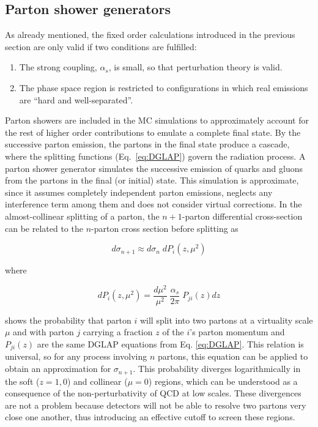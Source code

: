 \subsection{Parton shower generators}
    \label{subsec:PartonShowerGenerators}

As already mentioned, the fixed order calculations introduced in the previous section are only valid if two conditions are fulfilled:

\begin{enumerate}
\item The strong coupling, $\alpha_s$, is small, so that perturbation theory is valid.
\item The phase space region is restricted to configurations in which real emissions are ``hard and well-separated''.
\end{enumerate}

Parton showers are included in the MC simulations to approximately account for the rest of higher order contributions to emulate a complete final state.
By the successive parton emission, the partons in the final state produce a cascade, where the splitting functions (Eq.~\ref{eq:DGLAP}) govern the radiation process.
A parton shower generator simulates the successive emission of quarks and gluons from the partons in the final (or initial) state.
This simulation is approximate, since it assumes completely independent parton emissions, neglects any interference term among them and does not consider virtual corrections.
In the almost-collinear splitting of a parton, the $n+1$-parton differential cross-section can be related to the $n$-parton cross section before splitting as

\begin{equation}
d\sigma_{n+1} \approx d\sigma_n \; dP_i(z,\mu^2)
\label{eq:PSrelation}
\end{equation}

\noindent where

\begin{equation}
dP_i(z,\mu^2) = \frac{d\mu^2}{\mu^2} \; \frac{\alpha_s}{2\pi} \; P_{ji}(z)dz 
\label{eq:dPi}
\end{equation}

\noindent shows the probability that parton $i$ will split into two partons at a virtuality scale $\mu$ and with parton $j$ carrying a fraction $z$ of the $i$'s parton momentum and $P_{ji}(z)$ are the same DGLAP equations from Eq. \ref{eq:DGLAP}.
This relation is universal, so for any process involving $n$ partons, this equation can be applied to obtain an approximation for $\sigma_{n+1}$.
This probability diverges logarithmically in the soft ($z=1, 0$) and collinear ($\mu = 0$) regions, which can be understood as a consequence of the non-perturbativity of QCD at low scales.
These divergences are not a problem because detectors will not be able to resolve two partons very close one another, thus introducing an effective cutoff to screen these regions.

